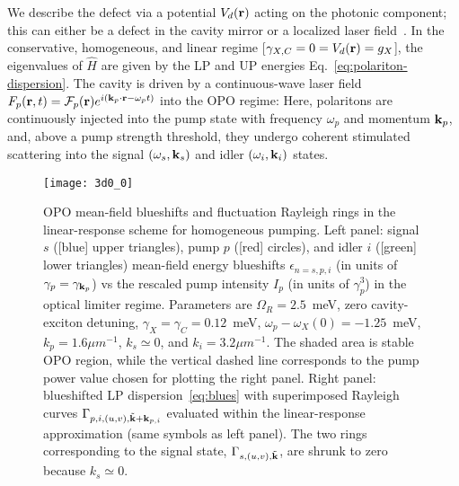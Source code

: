 %
We describe the defect via a potential $V_d (\mathbf{r})$ acting on the
photonic component; this can either be a defect in the cavity mirror
or a localized laser field~\cite{Amo_2009,Amo_2010,Zajac_2012}.
%
In the conservative, homogeneous, and linear regime [$\gamma_{X,C}=0=
V_d (\mathbf{r})= g_X$], the eigenvalues of $\hat{H}$ are given by the
LP and UP energies Eq.~\eqref{eq:polariton-dispersion}.
%
The cavity is driven by a continuous-wave laser field $F_p(\mathbf{r},t)
= \mathcal{F}_p(\mathbf{r}) e^{i (\mathbf{k}_p \cdot \mathbf{r} - \omega_p
  t)}$ into the OPO regime: Here, polaritons are continuously injected
into the pump state with frequency $\omega_p$ and momentum
$\mathbf{k}_p$, and, above a pump strength threshold, they undergo coherent
stimulated scattering into the signal $(\omega_s, \mathbf{k}_s)$ and
idler $(\omega_i, \mathbf{k}_i)$ states. 
%
\begin{figure}[tb]
\centering
\texttt{[image: 3d0\_0]} %
\caption{OPO mean-field blueshifts and fluctuation
  Rayleigh rings in the linear-response scheme for homogeneous
  pumping. Left panel: signal $s$ ([blue] upper triangles), pump $p$
  ([red] circles), and idler $i$ ([green] lower triangles) mean-field
  energy blueshifts $\epsilon_{n=s,p,i}$ (in units of $\gamma_p =
  \gamma_{\mathbf{k}_p}$) vs the rescaled pump intensity $I_p$ (in
  units of $\gamma_p^3$) in the optical limiter regime. Parameters are
  $\Omega_R=2.5$~meV, zero cavity-exciton detuning, $\gamma_X = \gamma_C
  = 0.12$~meV, $\omega_p - \omega_X(0) = -1.25$~meV, $k_p=1.6{\mu
    m}^{-1}$, $k_s \simeq 0$, and $k_i=3.2{\mu m}^{-1}$.  The shaded
  area is stable OPO region, while the vertical dashed line
  corresponds to the pump power value chosen for plotting the right
  panel. Right panel: blueshifted LP dispersion~\eqref{eq:blues} with
  superimposed Rayleigh curves $\Gamma_{p,i,(u,v), \tilde{\mathbf{k}} +
    \mathbf{k}_{p, i}}$ evaluated within the linear-response
  approximation (same symbols as left panel). The two rings
  corresponding to the signal state, $\Gamma_{s,(u,v),
    \tilde{\mathbf{k}}}$, are shrunk to zero because $k_s \simeq 0$.}
\label{fig:spect}
\end{figure}
%


